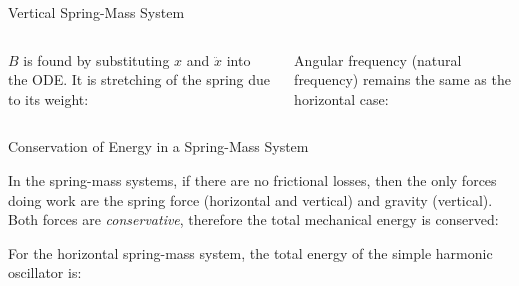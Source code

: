 \documentclass[12pt,compress,aspectratio=169]{beamer}
\begin{document}
\begin{frame}{Vertical Spring-Mass System}
  \begin{columns}

    $B$ is found by substituting $x$ and $\ddot x$ into the ODE.
    It is stretching of the spring due to its weight:
    

    Angular frequency (natural frequency) remains the same as the horizontal
    case:

  \end{columns}
\end{frame}



\begin{frame}{Conservation of Energy in a Spring-Mass System}

  In the spring-mass systems, if there are no frictional losses, then the only
  forces doing work are the spring force (horizontal and vertical) and gravity
  (vertical). Both forces are \emph{conservative}, therefore the total
  mechanical energy is conserved:

  
  For the horizontal spring-mass system, the total energy of the simple harmonic
  oscillator is:
    
\end{frame}
\end{document}
